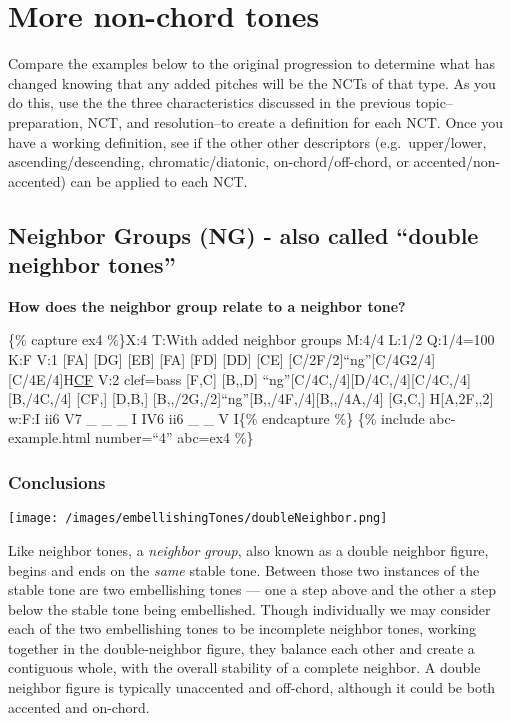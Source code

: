 \documentclass{book}
\begin{document}
\hypertarget{more-non-chord-tones}{%
\section{More non-chord tones}\label{more-non-chord-tones}}

Compare the examples below to the original progression to determine what has
changed knowing that any added pitches will be the NCTs of that type. As you
do this, use the the three characteristics discussed in the previous
topic--preparation, NCT, and resolution--to create a definition for each NCT.
Once you have a working definition, see if the other other descriptors
(e.g.~upper/lower, ascending/descending, chromatic/diatonic,
on-chord/off-chord, or accented/non-accented) can be applied to each NCT.

\hypertarget{neighbor-groups-ng---also-called-double-neighbor-tones}{%
\subsection{Neighbor Groups (NG) - also called ``double neighbor
tones''}\label{neighbor-groups-ng---also-called-double-neighbor-tones}}

\textbf{How does the neighbor group relate to a neighbor tone?}

\{\% capture ex4 \%\}X:4 T:With added neighbor groups M:4/4 L:1/2 Q:1/4=100
K:F V:1 {[}FA{]}\textbar{} {[}DG{]} {[}EB{]}\textbar{} {[}FA{]}
{[}FD{]}\textbar{} {[}DD{]} {[}CE{]}\textbar{}
{[}C/2F/2{]}``ng''{[}C/4G2/4{]}{[}C/4E/4{]}H\href{cantusFirmus.html}{CF}\textbar{]}
V:2 clef=bass {[}F,C{]}\textbar{} {[}B,,D{]}
``ng''{[}C/4C,/4{]}{[}D/4C,/4{]}{[}C/4C,/4{]}{[}B,/4C,/4{]}\textbar{}
{[}CF,{]} {[}D,B,{]}\textbar{}
{[}B,,/2G,/2{]}``ng''{[}B,,/4F,/4{]}{[}B,,/4A,/4{]} {[}G,C,{]}\textbar{}
H{[}A,2F,,2{]}\textbar{]} w:F:I ii6 V7 \_ \_ \_ I IV6 ii6 \_ \_ V I\{\%
endcapture \%\} \{\% include abc-example.html number=``4'' abc=ex4 \%\}

\hypertarget{conclusions-39}{%
\subsubsection{Conclusions}\label{conclusions-39}}

\texttt{[image: /images/embellishingTones/doubleNeighbor.png]}

Like neighbor tones, a \emph{neighbor group}, also known as a double neighbor
figure, begins and ends on the \emph{same} stable tone. Between those two
instances of the stable tone are two embellishing tones --- one a step above
and the other a step below the stable tone being embellished. Though
individually we may consider each of the two embellishing tones to be
incomplete neighbor tones, working together in the double-neighbor figure,
they balance each other and create a contiguous whole, with the overall
stability of a complete neighbor. A double neighbor figure is typically
unaccented and off-chord, although it could be both accented and on-chord.
\end{document}

